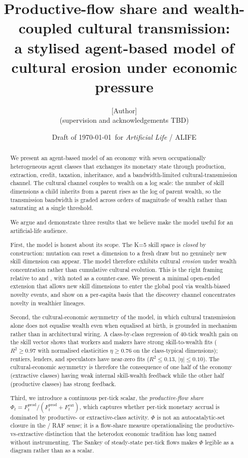 \documentclass[11pt]{article}
\title{Productive-flow share and wealth-coupled cultural transmission:\\
\large a stylised agent-based model of cultural erosion under economic pressure}
\author{[Author]\\
\small (supervision and acknowledgements TBD)}
\date{Draft of \today\ for \emph{Artificial Life} / ALIFE}
\begin{document}
\maketitle

\begin{abstract}
We present an agent-based model of an economy with seven occupationally
heterogeneous agent classes that exchanges its monetary state through
production, extraction, credit, taxation, inheritance, and a
bandwidth-limited cultural-transmission channel. The cultural channel
couples to wealth on a log scale: the number of skill dimensions a child
inherits from a parent rises as the log of parent wealth, so the
transmission bandwidth is graded across orders of magnitude of wealth
rather than saturating at a single threshold.

We argue and demonstrate three results that we believe make the model
useful for an artificial-life audience.

First, the model is honest about its scope. The K=5 skill space is
\emph{closed} by construction: mutation can reset a dimension to a fresh
draw but no genuinely new skill dimension can appear. The model
therefore exhibits cultural \emph{erosion} under wealth concentration
rather than cumulative cultural evolution. This is the right framing
relative to \citet{henrich2015secret} and \citet{henrich2004demography},
with \citet{vaesen2016cumulative} noted as a counter-case. We present a
minimal open-ended extension that allows new skill dimensions to enter
the global pool via wealth-biased novelty events, and show on a
per-capita basis that the discovery channel concentrates novelty in
wealthier lineages.

Second, the cultural-economic asymmetry of the model, in which cultural
transmission alone does not equalise wealth even when equalised at
birth, is grounded in mechanism rather than in architectural wiring.
A class-by-class regression of 40-tick wealth gain on the skill vector
shows that workers and makers have strong skill-to-wealth fits ($R^2
\geq 0.97$ with normalised elasticities $\eta \geq 0.76$ on the
class-typical dimensions); rentiers, lenders, and speculators have
near-zero fits ($R^2 \leq 0.13$, $|\eta| \leq 0.10$). The
cultural-economic asymmetry is therefore the consequence of one half of
the economy (extractive classes) having weak internal skill-wealth
feedback while the other half (productive classes) has strong feedback.

Third, we introduce a continuous per-tick scalar, the
\emph{productive-flow share} $\Phi_t = F^\text{prod}_t /
(F^\text{prod}_t + F^\text{ext}_t)$, which captures whether per-tick
monetary accrual is dominated by productive- or extractive-class activity.
$\Phi$ is not an autocatalytic-set closure in the
\citet{kauffman1988evolution} / \citet{hordijk2004detecting} RAF sense;
it is a flow-share measure operationalising the productive-vs-extractive
distinction that the heterodox economic tradition has long named
without instrumenting. The Sankey of steady-state per-tick flows
makes $\Phi$ legible as a diagram rather than as a scalar.


\end{abstract}
\end{document}

